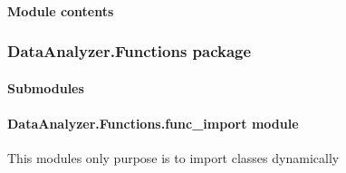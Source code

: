 \documentclass[letterpaper,10pt,english]{sphinxmanual}
\begin{document}
\paragraph{Module contents}
\label{\detokenize{DataAnalyzer.Data:module-DataAnalyzer.Data}}\label{\detokenize{DataAnalyzer.Data:module-contents}}

\subsubsection{DataAnalyzer.Functions package}
\label{\detokenize{DataAnalyzer.Functions:dataanalyzer-functions-package}}\label{\detokenize{DataAnalyzer.Functions::doc}}

\paragraph{Submodules}
\label{\detokenize{DataAnalyzer.Functions:submodules}}

\paragraph{DataAnalyzer.Functions.func\_import module}
\label{\detokenize{DataAnalyzer.Functions:module-DataAnalyzer.Functions.func_import}}\label{\detokenize{DataAnalyzer.Functions:dataanalyzer-functions-func-import-module}}
This modules only purpose is to import classes dynamically
\end{document}
